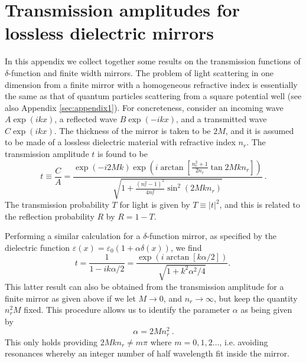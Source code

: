 \documentclass[twocolumn,english,pra,aps,superscriptaddress,floatfix]{revtex4-1}
\begin{document}
\section{Transmission amplitudes for lossless dielectric mirrors}
\label{sec:appendix2}

In this appendix we collect together some results on the transmission  functions of $\delta$-function and finite width mirrors. The problem of light scattering in one dimension from a finite mirror with a homogeneous refractive index is essentially the same as that of quantum particles scattering from a square potential well \cite{schiff} (see also Appendix \ref{sec:appendix1}). For concreteness, consider an incoming wave $A \exp (i  k x)$, a reflected wave $B \exp (-i  k x)$, and a transmitted wave $C \exp (i k x)$. The thickness of the mirror is taken to be $2M$, and it is assumed to be made of a lossless dielectric material with refractive index $n_{r}$. The transmission amplitude $t$ is found to be
\begin{equation}
t \equiv \frac{C}{A} = \frac{\exp (-i 2 M k )\exp (i \arctan[\frac{n_{r}^2+1}{2n_{r}}\tan 2Mk n_{r}])}{\sqrt{1+\frac{(n_{r}^2-1)^2}{4n_{r}^2} \sin^{2} (2 M k n_{r})}} \ .
\label{eq:finitetransmission}
\end{equation}
The transmission probability $T$ for light is given by $T \equiv \vert t \vert^2$, and this is related to the reflection probability $R$ by $R  = 1- T$. 

Performing a similar calculation for a $\delta$-function mirror, as specified by the dielectric function $\varepsilon(x)= \varepsilon_{0} (1+\alpha \delta (x))$, we find
\begin{equation}
t= \frac{1}{1-i k \alpha/2}= \frac{\exp(i \arctan[ k \alpha/2])}{\sqrt{1+k^2 \alpha^2/4}} .\
\label{eq:deltatransmission}
\end{equation}
This latter result can also be obtained from the transmission amplitude for a finite mirror as given above if we let $M \rightarrow 0$, and $n_{r} \rightarrow \infty$, but keep the quantity $n_{r}^2 M$ fixed. This procedure allows us to identify the parameter $\alpha$ as being given by
\begin{equation}
\alpha = 2 M n_{r}^2 \ .
\label{eq:alphathin}
\end{equation}
This only holds providing $2Mk n_{r} \neq m \pi $ where $m=0,1,2\ldots$, i.e. avoiding resonances whereby an integer number of half wavelength fit inside the mirror.
\end{document}
